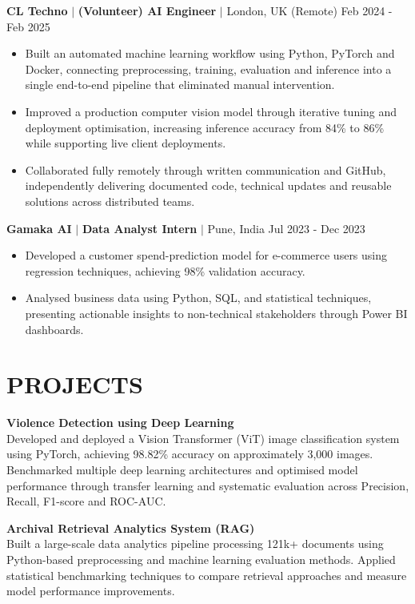 \documentclass[11pt,a4paper, sans-serif]{article}
\begin{document}
\noindent\textbf{CL Techno} $|$ \textbf{(Volunteer) AI Engineer} $|$ London, UK (Remote) \hfill Feb 2024 - Feb 2025

\begin{itemize}[leftmargin=*, nosep]
    \item Built an automated machine learning workflow using Python, PyTorch and Docker, connecting preprocessing, training, evaluation and inference into a single end-to-end pipeline that eliminated manual intervention. 
    \item Improved a production computer vision model through iterative tuning and deployment optimisation, increasing inference accuracy from 84\% to 86\% while supporting live client deployments. 
    \item Collaborated fully remotely through written communication and GitHub, independently delivering documented code, technical updates and reusable solutions across distributed teams.
\end{itemize}


\noindent\textbf{Gamaka AI} $|$ \textbf{Data Analyst Intern} $|$ Pune, India \hfill Jul 2023 - Dec 2023
\begin{itemize}[leftmargin=*, nosep]
    \item Developed a customer spend-prediction model for e-commerce users using regression techniques, achieving 98\% validation accuracy.
    \item Analysed business data using Python, SQL, and statistical techniques, presenting actionable insights to non-technical stakeholders through Power BI dashboards.
\end{itemize}

\section*{PROJECTS}
\noindent\textbf{Violence Detection using Deep Learning} \\
\noindent Developed and deployed a Vision Transformer (ViT) image classification system using PyTorch, achieving 98.82\% accuracy on approximately 3,000 images. Benchmarked multiple deep learning architectures and optimised model performance through transfer learning and systematic evaluation across Precision, Recall, F1-score and ROC-AUC.

\noindent\textbf{Archival Retrieval Analytics System (RAG)} \\
\noindent Built a large-scale data analytics pipeline processing 121k+ documents using Python-based preprocessing and machine learning evaluation methods. Applied statistical benchmarking techniques to compare retrieval approaches and measure model performance improvements.
\end{document}
